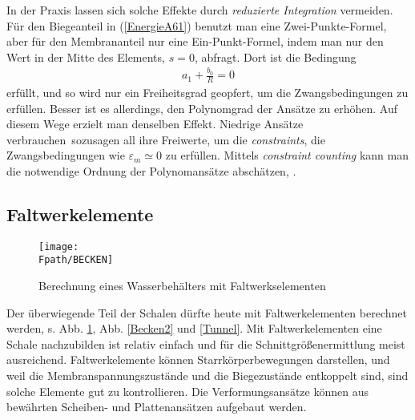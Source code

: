 In der Praxis lassen sich solche Effekte durch {\em reduzierte Integration\/} vermeiden. F\"{u}r den Biegeanteil in (\ref{EnergieA61}) benutzt man eine Zwei-Punkte-Formel, aber f\"{u}r den Membrananteil nur eine Ein-Punkt-Formel, indem man nur den Wert in der Mitte des Elements, $s = 0$, abfragt. Dort ist die Bedingung
\begin{align}
a_1 + \frac{b_0}{R} = 0
\end{align}
erf\"{u}llt, und so wird nur ein Freiheitsgrad geopfert, um die Zwangsbedingungen zu erf\"{u}llen. Besser ist es allerdings, den Polynomgrad der Ans\"{a}tze zu erh\"{o}hen. Auf diesem Wege erzielt man denselben Effekt. Niedrige Ans\"{a}tze \glq verbrauchen\grq\ sozusagen all ihre Freiwerte, um die {\em constraints\/}, die Zwangsbedingungen wie $\varepsilon_m \simeq 0$ zu erf\"{u}llen. Mittels {\em constraint counting\/} kann man die notwendige Ordnung der Polynomans\"{a}tze absch\"{a}tzen, \cite{Cook1}.
{\textcolor{sectionTitleBlue}{\section{Faltwerkelemente}}}\label{Faltwerkelemente}
\begin{figure}[tbp] \centering
\if {} \sidecaption \fi
\texttt{[image: \\Fpath/BECKEN]}
\caption{Berechnung eines Wasserbeh\"{a}lters mit Faltwerkselementen}  \label{Becken}
\end{figure}%

Der \"{u}berwiegende Teil der Schalen d\"{u}rfte heute mit Faltwerkelementen berechnet werden, s. Abb. \ref{Becken}, Abb. \ref{Becken2} und \ref{Tunnel}. Mit Faltwerkelementen eine Schale nachzubilden ist relativ einfach und f\"{u}r die Schnittgr\"{o}{\ss}enermittlung meist ausreichend. Faltwerkelemente k\"{o}nnen Starrk\"{o}rperbewegungen darstellen, und weil die Membranspannungszust\"{a}nde und die Biegezust\"{a}nde entkoppelt sind, sind solche Elemente gut zu kontrollieren. Die Verformungsans\"{a}tze k\"{o}nnen aus bew\"{a}hrten Scheiben- und Plattenans\"{a}tzen aufgebaut werden.

